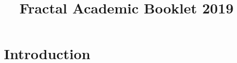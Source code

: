 \documentclass[10pt, a4paper]{book}
\title{Fractal Academic Booklet 2019}
\author{}
\date{}
\newcommand{\chaptertitle}[1]{
    \stepcounter{chapter}
    \chapter*{\thechapter\hspace{3mm}#1}\addcontentsline{toc}{chapter}{\thechapter\hspace{3mm}#1}
}
\begin{document}


\begingroup
\let\cleardoublepage\clearpage
\tableofcontents
\endgroup
\chapter{Introduction}


\newpage
\end{document}

